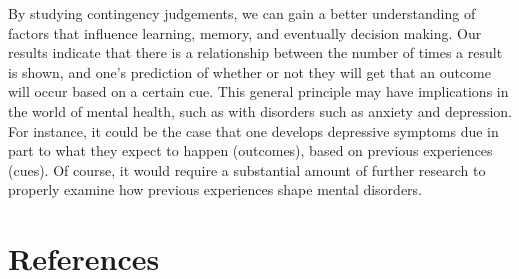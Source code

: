 \documentclass[
  english,
  man]{apa6}
\begin{document}
By studying contingency judgements, we can gain a better understanding of factors that influence learning, memory, and eventually decision making. Our results indicate that there is a relationship between the number of times a result is shown, and one's prediction of whether or not they will get that an outcome will occur based on a certain cue. This general principle may have implications in the world of mental health, such as with disorders such as anxiety and depression. For instance, it could be the case that one develops depressive symptoms due in part to what they expect to happen (outcomes), based on previous experiences (cues). Of course, it would require a substantial amount of further research to properly examine how previous experiences shape mental disorders.

\newpage

\hypertarget{references}{%
\section{References}\label{references}}

\begingroup
\setlength{\parindent}{-0.5in}
\setlength{\leftskip}{0.5in}

\hypertarget{refs}{}

\endgroup
\end{document}
